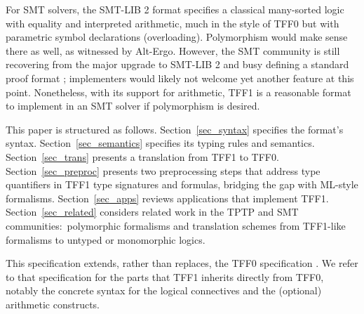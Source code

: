 For SMT solvers, the SMT-LIB 2 format \cite{barrett-et-al-2010} specifies a
classical many-sorted logic with equality and interpreted arithmetic, much in
the style of TFF0 but with parametric symbol declarations (overloading).
Polymorphism would make sense there as well, as witnessed by Alt-Ergo.
However, the SMT community is still recovering from the major
upgrade to SMT-LIB 2 and busy defining a standard proof format
\cite{besson-et-al-2011}; implementers would likely not welcome yet another
feature at this point. Nonetheless, with its support for arithmetic, TFF1 is a
reasonable format to implement in an SMT solver if polymorphism is desired.

\newcommand\cheat{\vskip0.3ex} %

This paper is structured as follows.
Section~\ref{sec_syntax} specifies the format's syntax.
Section~\ref{sec_semantics} specifies its typing rules and semantics.
Section~\ref{sec_trans} presents a translation from TFF1 to TFF0.
Section~\ref{sec_preproc} presents two preprocessing steps that address type quantifiers
in TFF1 type signatures and formulas, bridging the gap with ML-style
formalisms. %
Section~\ref{sec_apps} reviews applications that implement TFF1.
Section~\ref{sec_related} considers related work in the TPTP and SMT
communities:\ polymorphic formalisms and translation schemes from
TFF1-like formalisms to untyped or monomorphic logics.

This specification extends, rather than replaces, the TFF0 specification
\cite{sutcliffe-et-al-2012-tff0}. We refer to that specification for the parts
that TFF1 inherits directly from TFF0, notably the
concrete syntax for the logical connectives and the
(optional) arithmetic constructs.
